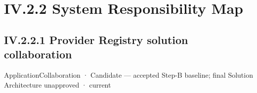 \section*{IV.2.2 System Responsibility Map}
\label{navigation:IV.2.2}

\subsection*{IV.2.2.1 Provider Registry solution collaboration}
\label{navigation:IV.2.2.1}

\label{element:9305dc8d55b34b70950190e28b5464cf}
{\small ApplicationCollaboration · Candidate — accepted Step-B baseline; final Solution Architecture unapproved · current}\par

